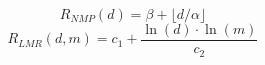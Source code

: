 \begin{equation}
    \label{eq:nmp_reduction}
    R_{NMP}(d) = \beta + \lfloor d / \alpha \rfloor
\end{equation}
\begin{equation}
    \label{eq:lmr_reduction}
    R_{LMR}(d, m) = c_1 + \frac{\ln(d) \cdot \ln(m)}{c_2}
\end{equation}
